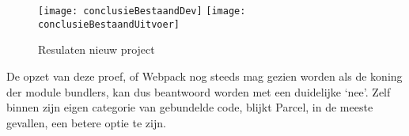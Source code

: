 \begin{figure}[h]
    \texttt{[image: conclusieBestaandDev]}
        \centering
        \texttt{[image: conclusieBestaandUitvoer]}
        \centering
        \caption[]{Resulaten nieuw project}
    \end{figure}

    De opzet van deze proef, of Webpack nog steeds mag gezien worden als de koning der module bundlers, kan dus beantwoord worden met een duidelijke ‘nee’. Zelf binnen zijn eigen categorie van gebundelde code, blijkt Parcel, in de meeste gevallen, een betere optie te zijn. 